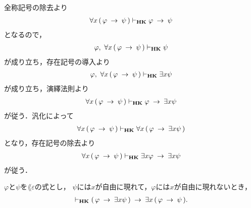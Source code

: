 	\begin{sketch}
		全称記号の除去より
		\begin{align}
			\forall x\, (\, \varphi \hspace{0.25em}\rightarrow\hspace{0.25em} \psi\, ) \vdash_{{\scriptsize \mbox{{\bf HK}}}}
			\varphi \hspace{0.25em}\rightarrow\hspace{0.25em} \psi
		\end{align}
		となるので，
		\begin{align}
			\varphi,\ \forall x\, (\, \varphi \hspace{0.25em}\rightarrow\hspace{0.25em} \psi\, ) 
			\vdash_{{\scriptsize \mbox{{\bf HK}}}} \psi
		\end{align}
		が成り立ち，存在記号の導入より
		\begin{align}
			\varphi,\ \forall x\, (\, \varphi \hspace{0.25em}\rightarrow\hspace{0.25em} \psi\, ) 
			\vdash_{{\scriptsize \mbox{{\bf HK}}}} \exists x \psi
		\end{align}
		が成り立ち，演繹法則より
		\begin{align}
			\forall x\, (\, \varphi \hspace{0.25em}\rightarrow\hspace{0.25em} \psi\, ) 
			\vdash_{{\scriptsize \mbox{{\bf HK}}}} \varphi \hspace{0.25em}\rightarrow\hspace{0.25em} \exists x \psi
		\end{align}
		が従う．汎化によって
		\begin{align}
			\forall x\, (\, \varphi \hspace{0.25em}\rightarrow\hspace{0.25em} \psi\, ) \vdash_{{\scriptsize \mbox{{\bf HK}}}} 
			\forall x\, (\, \varphi \hspace{0.25em}\rightarrow\hspace{0.25em} \exists x \psi\, )
		\end{align}
		となり，存在記号の除去より
		\begin{align}
			\forall x\, (\, \varphi \hspace{0.25em}\rightarrow\hspace{0.25em} \psi\, ) \vdash_{{\scriptsize \mbox{{\bf HK}}}} 
			\exists x \varphi \hspace{0.25em}\rightarrow\hspace{0.25em} \exists x \psi
		\end{align}
		が従う．
	\end{sketch}
	
	\begin{screen}
		\begin{thm}
			$\varphi$と$\psi$を$\lang{\varepsilon}$の式とし，
			$\psi$には$x$が自由に現れて，$\varphi$には$x$が自由に現れないとき，
			\begin{align}
				\vdash_{{\scriptsize \mbox{{\bf HK}}}} (\, \varphi \hspace{0.25em}\rightarrow\hspace{0.25em} \exists x \psi\, ) 
				\hspace{0.25em}\rightarrow\hspace{0.25em} \exists x\, (\, \varphi \hspace{0.25em}\rightarrow\hspace{0.25em} \psi\, ).
			\end{align}
		\end{thm}
	\end{screen}
	
